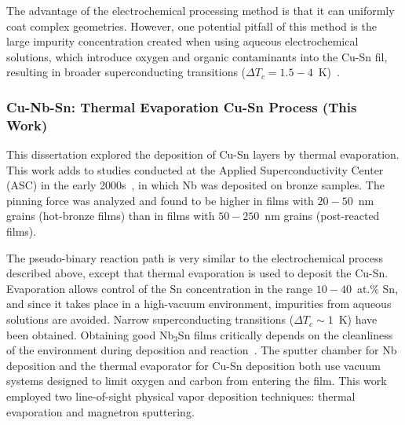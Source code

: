     The advantage of the electrochemical processing method is that it can uniformly coat complex geometries. However, one potential pitfall of this method is the large impurity concentration created when using aqueous electrochemical solutions, which introduce oxygen and organic contaminants into the Cu-Sn fil, resulting in broader superconducting transitions ($\Delta T_c = 1.5-4$~K)~\cite{luDevelopmentPerformanceFirst2022, luElectrochemicalThermalSynthesis2021, luImpactCuSn2025}.
    
    \subsubsection{Cu-Nb-Sn: Thermal Evaporation Cu-Sn Process (This Work)}\label{sec:ourworkdescribe}
    
    This dissertation explored the deposition of Cu-Sn layers by thermal evaporation. This work adds to studies conducted at the Applied Superconductivity Center (ASC) in the early 2000s~\cite{cooleyShiftFluxpinningForce2001}, in which Nb was deposited on bronze samples. The pinning force was analyzed and found to be higher in films with $20-50$~nm grains (hot-bronze films) than in films with $50-250$~nm grains (post-reacted films).

    The pseudo-binary reaction path is very similar to the electrochemical process described above, except that thermal evaporation is used to deposit the Cu-Sn. Evaporation allows control of the Sn concentration in the range $10-40$~at.\% Sn, and since it takes place in a high-vacuum environment, impurities from aqueous solutions are avoided. Narrow superconducting transitions ($\Delta T_c \sim 1 $~K) have been obtained. Obtaining good Nb$_3$Sn films critically depends on the cleanliness of the environment during deposition and reaction~\cite{withanageRapidNbSn2021}. The sputter chamber for Nb deposition and the thermal evaporator for Cu-Sn deposition both use vacuum systems designed to limit oxygen and carbon from entering the film. This work employed two line-of-sight physical vapor deposition techniques: thermal evaporation and magnetron sputtering.


